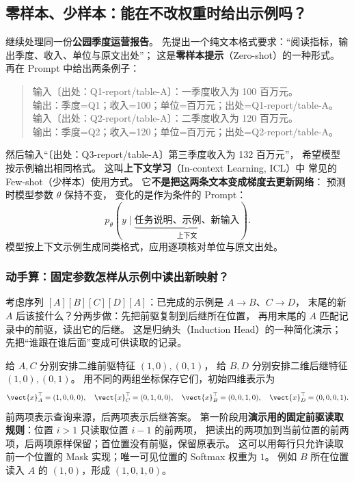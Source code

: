 \subsection{零样本、少样本：能在不改权重时给出示例吗？}
\label{concept:few-shot}

继续处理同一份\textbf{公园季度运营报告}。
先提出一个纯文本格式要求：“阅读指标，输出季度、收入、单位与原文出处”；
这是\textbf{零样本提示}（Zero-shot）的一种形式。
再在 Prompt 中给出两条例子：

\begin{quote}
输入〔出处：Q1-report/table-A〕：一季度收入为 100 百万元。\\
输出：季度=Q1；收入=100；单位=百万元；出处=Q1-report/table-A。\\
输入〔出处：Q2-report/table-A〕：二季度收入为 120 百万元。\\
输出：季度=Q2；收入=120；单位=百万元；出处=Q2-report/table-A。
\end{quote}

然后输入“〔出处：Q3-report/table-A〕第三季度收入为 132 百万元”，
希望模型按示例输出相同格式。
这叫\textbf{上下文学习}（In-context Learning, ICL）中
常见的 Few-shot（少样本）使用方式。
它\textbf{不是把这两条文本变成梯度去更新网络}：
预测时模型参数 $\theta$ 保持不变，
变化的是作为条件的 Prompt：
\[
p_\theta(y\mid\underbrace{\text{任务说明、示例、新输入}}_{\text{上下文}}).
\]
模型按上下文示例生成同类格式，应用逐项核对单位与原文出处。

\subsubsection{动手算：固定参数怎样从示例中读出新映射？}
\label{sec:icl-induction}
考虑序列 $[A][B][C][D][A]$：已完成的示例是 $A\to B$、$C\to D$，
末尾的新 $A$ 后该接什么？分两步做：先把前驱复制到后继所在位置，
再用末尾的 $A$ 匹配记录中的前驱，读出它的后继。
这是归纳头（Induction Head）的一种简化演示；先把“谁跟在谁后面”变成可供读取的记录。

给 $A,C$ 分别安排二维前驱特征 $(1,0),(0,1)$，
给 $B,D$ 分别安排二维后继特征 $(1,0),(0,1)$。
用不同的两组坐标保存它们，初始四维表示为
\[
\vect{x}_A^\top=(1,0,0,0),\quad \vect{x}_C^\top=(0,1,0,0),\quad
\vect{x}_B^\top=(0,0,1,0),\quad \vect{x}_D^\top=(0,0,0,1).
\]
前两项表示查询来源，后两项表示后继答案。
第一阶段用\textbf{演示用的固定前驱读取规则}：位置 $i>1$ 只读取位置 $i-1$ 的前两项，
把读出的两项加到当前位置的前两项，后两项原样保留；首位置没有前驱，保留原表示。
这可以用每行只允许读取前一个位置的 Mask 实现；唯一可见位置的 Softmax 权重为 $1$。
例如 $B$ 所在位置读入 $A$ 的 $(1,0)$，形成 $(1,0,1,0)$。

